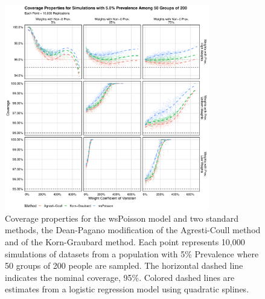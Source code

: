 \documentclass[AMA,STIX1COL]{WileyNJD-v2}
\begin{document}
\begin{figure}
\centering
\includegraphics[width=0.8\textwidth]{figures/perfect_coverage_50_groups_0_05_prev.pdf}
\caption{Coverage properties for the wsPoisson model and two standard methods, the Dean-Pagano modification of the Agresti-Coull method and of the Korn-Graubard method.
Each point represents 10,000 simulations of datasets from a population with 5\% Prevalence where 50 groups of 200 people are sampled.
The horizontal dashed line indicates the nominal coverage, 95\%.
Colored dashed lines are estimates from a logistic regression model using quadratic splines.}
\label{fig:perfect_coverage_50_groups_0_05_prev}
\end{figure}
\end{document}
